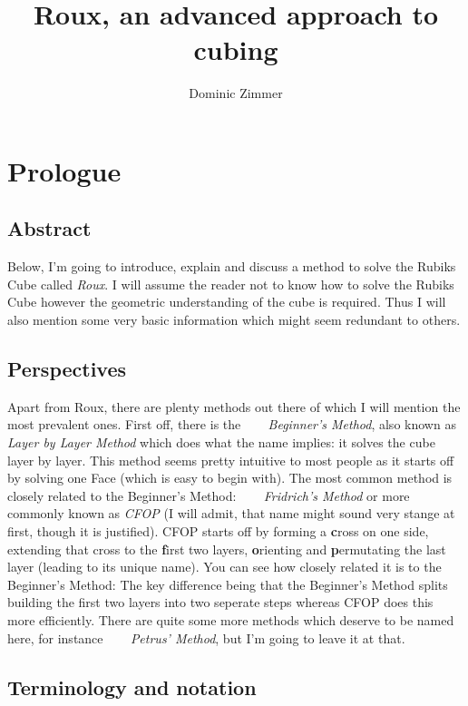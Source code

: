 \documentclass{scrreprt}
\begin{document}
\title{Roux, an advanced approach to cubing}
\author{Dominic Zimmer}
\maketitle 

\tableofcontents
\chapter{Prologue}

\section{Abstract}
Below, I'm going to introduce, explain and discuss a method to solve the Rubiks Cube called \emph{Roux}. I will assume the reader not to know how to solve the Rubiks Cube however the geometric understanding of the cube is required. Thus I will also mention some very basic information which might seem redundant to others.

\section{Perspectives}
Apart from Roux, there are plenty methods out there of which I will mention the most prevalent ones. First off, there is the ~~~ \emph{Beginner's Method}, also known as \emph{Layer by Layer Method} which does what the name implies: it solves the cube layer by layer. This method seems pretty intuitive to most people as it starts off by solving one Face (which is easy to begin with). The most common method is closely related to the Beginner's Method: ~~~ \emph{Fridrich's Method} or more commonly known as \emph{CFOP} (I will admit, that name might sound very stange at first, though it is justified). CFOP starts off by forming a \textbf{c}ross on one side, extending that cross to the \textbf{f}irst two layers, \textbf{o}rienting and \textbf{p}ermutating the last layer (leading to its unique name). You can see how closely related it is to the Beginner's Method: The key difference being that the Beginner's Method splits building the first two layers into two seperate steps whereas CFOP does this more efficiently. There are quite some more methods which deserve to be named here, for instance ~~~ \emph{Petrus' Method}, but I'm going to leave it at that.

\section{Terminology and notation}
\end{document}
